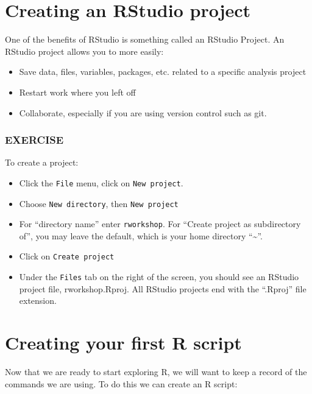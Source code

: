 \documentclass[]{book}
\providecommand{\tightlist}{%
  \setlength{\itemsep}{0pt}\setlength{\parskip}{0pt}}
\begin{document}
\hypertarget{creating-an-rstudio-project}{%
\section{Creating an RStudio project}\label{creating-an-rstudio-project}}

One of the benefits of RStudio is something called an RStudio Project. An RStudio project allows you to more easily:

\begin{itemize}
\tightlist
\item
  Save data, files, variables, packages, etc. related to a specific analysis project
\item
  Restart work where you left off
\item
  Collaborate, especially if you are using version control such as git.
\end{itemize}

\hypertarget{exercise}{%
\subsubsection*{EXERCISE}\label{exercise}}

To create a project:

\begin{itemize}
\tightlist
\item
  Click the \texttt{File} menu, click on \texttt{New\ project}.
\item
  Choose \texttt{New\ directory}, then
  \texttt{New\ project}
\item
  For ``directory name'' enter \texttt{rworkshop}. For ``Create project as subdirectory of'', you may leave the default, which is your home directory ``\textasciitilde{}''.
\item
  Click on \texttt{Create\ project}
\item
  Under the \texttt{Files} tab on the right of the screen, you should see an RStudio project file, rworkshop.Rproj. All RStudio projects end with the ``.Rproj'' file extension.
\end{itemize}

\hypertarget{creating-your-first-r-script}{%
\section{Creating your first R script}\label{creating-your-first-r-script}}

Now that we are ready to start exploring R, we will want to keep a record of the commands we are using. To do this we can create an R script:
\end{document}
